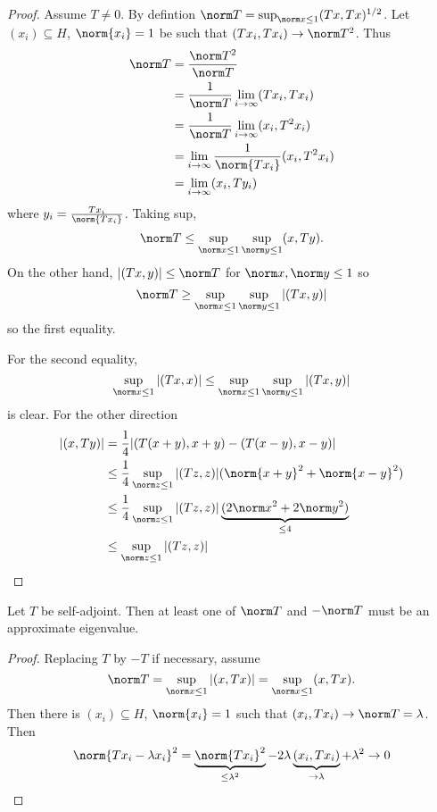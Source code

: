 \documentclass[a4paper]{article}
\begin{document}
\begin{proof}
  Assume \(T \neq 0\). By defintion \(\norm T = \sup_{\norm x \leq 1} (Tx, Tx)^{1/2}\). Let \((x_i) \subseteq H\), \(\norm{x_i} = 1\) be such that \((Tx_i, Tx_i) \to \norm T^2\). Thus
  \begin{align*}
    \norm T
    &= \frac{\norm T^2}{\norm T} \\
    &= \frac{1}{\norm T} \lim_{i \to \infty} (Tx_i, Tx_i) \\
    &= \frac{1}{\norm T} \lim_{i \to \infty} (x_i, T^2x_i) \\
    &= \lim_{i \to \infty} \frac{1}{\norm{T x_i}} (x_i, T^2x_i) \\
    &= \lim_{i \to \infty} (x_i, Ty_i)
  \end{align*}
  where \(y_i = \frac{Tx_i}{\norm{Tx_i}}\). Taking sup,
  \[
    \norm T \leq \sup_{\norm x \leq 1} \sup_{\norm y \leq 1} (x, Ty).
  \]
  On the other hand, \(|(Tx, y)| \leq \norm T\) for \(\norm x, \norm y \leq 1\) so
  \[
    \norm T \geq \sup_{\norm x \leq 1} \sup_{\norm y \leq 1} |(Tx, y)|
  \]
  so the first equality.

  For the second equality,
  \[
    \sup_{\norm x \leq 1} |(Tx, x)| \leq \sup_{\norm x \leq 1} \sup_{\norm y \leq 1} |(Tx, y)|
  \]
  is clear. For the other direction
  \begin{align*}
    |(x, Ty)|
    &= \frac{1}{4} |(T(x + y), x + y) - (T(x - y), x - y)| \\
    &\leq \frac{1}{4} \sup_{\norm z \leq 1} |(Tz, z)| (\norm{x + y}^2 + \norm{x - y}^2) \\
    &\leq \frac{1}{4} \sup_{\norm z \leq 1} |(Tz, z)| \underbrace{(2 \norm x^2 + 2 \norm y^2)}_{\leq 4} \\
    &\leq \sup_{\norm z \leq 1} |(Tz, z)|
  \end{align*}
\end{proof}

\begin{lemma}
  Let \(T\) be self-adjoint. Then at least one of \(\norm T\) and \(- \norm T\) must be an approximate eigenvalue.
\end{lemma}

\begin{proof}
  Replacing \(T\) by \(-T\) if necessary, assume
  \[
    \norm T = \sup_{\norm x \leq 1} |(x, Tx)|= \sup_{\norm x \leq 1} (x, Tx).
  \]
  Then there is \((x_i) \subseteq H\), \(\norm{x_i} = 1\) such that \((x_i, Tx_i) \to \norm T = \lambda\). Then
  \[
    \norm{T x_i - \lambda x_i}^2
    = \underbrace{\norm{Tx_i}^2}_{\leq \lambda^2} - 2 \lambda \underbrace{(x_i, Tx_i)}_{\to \lambda} + \lambda^2
    \to 0
  \]
\end{proof}
\end{document}
